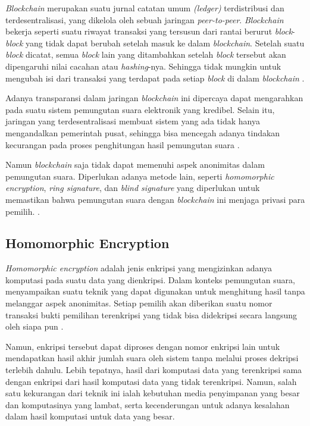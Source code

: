 \textit{Blockchain} merupakan suatu jurnal catatan umum \textit{(ledger)} terdistribusi dan terdesentralisasi, yang dikelola oleh sebuah jaringan \textit{peer-to-peer}. \textit{Blockchain} bekerja seperti suatu riwayat transaksi yang tersusun dari rantai berurut \textit{block}-\textit{block} yang tidak dapat berubah setelah masuk ke dalam \textit{blockchain}. Setelah suatu \textit{block} dicatat, semua \textit{block} lain yang ditambahkan setelah \textit{block} tersebut akan dipengaruhi nilai cacahan atau \textit{hashing}-nya. Sehingga tidak mungkin untuk mengubah isi dari transaksi yang terdapat pada setiap \textit{block} di dalam \textit{blockchain} \citep{koreanevoting}.

Adanya transparansi dalam jaringan \textit{blockchain} ini dipercaya dapat mengarahkan pada suatu sistem pemungutan suara elektronik yang kredibel. Selain itu, jaringan yang terdesentralisasi membuat sistem yang ada tidak hanya mengandalkan pemerintah pusat, sehingga bisa mencegah adanya tindakan kecurangan pada proses penghitungan hasil pemungutan suara \citep{blockchain}.

Namun \textit{blockchain} saja tidak dapat memenuhi aspek anonimitas dalam pemungutan suara. Diperlukan adanya metode lain, seperti \textit{homomorphic encryption}, \textit{ring signature}, dan \textit{blind signature} yang diperlukan untuk memastikan bahwa pemungutan suara dengan \textit{blockchain} ini menjaga privasi para pemilih. \citep{koreanevoting}.

\subsection{Homomorphic Encryption}

\textit{Homomorphic encryption} adalah jenis enkripsi yang mengizinkan adanya komputasi pada suatu data yang dienkripsi. Dalam konteks pemungutan suara, \cite{end2end} menyampaikan suatu teknik yang dapat digunakan untuk menghitung hasil tanpa melanggar aspek anonimitas. Setiap pemilih akan diberikan suatu nomor transaksi bukti pemilihan terenkripsi yang tidak bisa didekripsi secara langsung oleh siapa pun \citep{homomorphic2}.

Namun, enkripsi tersebut dapat diproses dengan nomor enkripsi lain untuk mendapatkan hasil akhir jumlah suara oleh sistem tanpa melalui proses dekripsi terlebih dahulu. Lebih tepatnya, hasil dari komputasi data yang terenkripsi sama dengan enkripsi dari hasil komputasi data yang tidak terenkripsi. Namun, salah satu kekurangan dari teknik ini ialah kebutuhan media penyimpanan yang besar dan komputasinya yang lambat, serta kecenderungan untuk adanya kesalahan dalam hasil komputasi untuk data yang besar. \citep{homomorphic1} 

